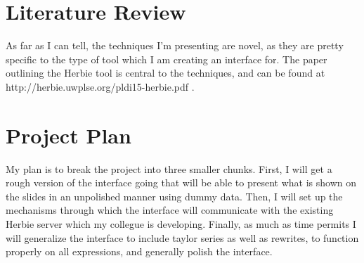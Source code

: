 \documentclass{article}
\begin{document}
\section{Literature Review}

As far as I can tell, the techniques I'm presenting are novel, as they
are pretty specific to the type of tool which I am creating an
interface for. The paper outlining the Herbie tool is central to the
techniques, and can be found at
http://herbie.uwplse.org/pldi15-herbie.pdf .

\section{Project Plan}

My plan is to break the project into three smaller chunks. First, I
will get a rough version of the interface going that will be able to
present what is shown on the slides in an unpolished manner using
dummy data. Then, I will set up the mechanisms through which the
interface will communicate with the existing Herbie server which my
collegue is developing. Finally, as much as time permits I will
generalize the interface to include taylor series as well as rewrites,
to function properly on all expressions, and generally polish the
interface.
\end{document}
